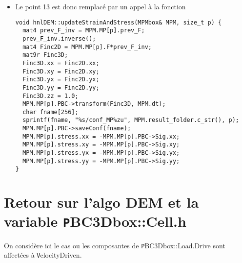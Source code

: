 \documentclass[12pt]{article}
\begin{document}
\begin{itemize}
La variable {\texttt PBC3Dbox::Load.v} est alors affectée à la valeur $\boldsymbol l$ et toutes les compoasantes de {\texttt PBC3Dbox::Load.Drive} 
sont affectées à {\texttt VelocityDriven}.
\item
Le point 13 est donc remplacé par un appel à la fonction 
\begin{verbatim} 
void hnlDEM::updateStrainAndStress(MPMbox& MPM, size_t p) {
  mat4 prev_F_inv = MPM.MP[p].prev_F;
  prev_F_inv.inverse();
  mat4 Finc2D = MPM.MP[p].F*prev_F_inv;
  mat9r Finc3D;
  Finc3D.xx = Finc2D.xx;
  Finc3D.xy = Finc2D.xy;
  Finc3D.yx = Finc2D.yx;
  Finc3D.yy = Finc2D.yy;
  Finc3D.zz = 1.0;
  MPM.MP[p].PBC->transform(Finc3D, MPM.dt);
  char fname[256];
  sprintf(fname, "%s/conf_MP%zu", MPM.result_folder.c_str(), p);
  MPM.MP[p].PBC->saveConf(fname);
  MPM.MP[p].stress.xx = -MPM.MP[p].PBC->Sig.xx;
  MPM.MP[p].stress.xy = -MPM.MP[p].PBC->Sig.xy;
  MPM.MP[p].stress.yx = -MPM.MP[p].PBC->Sig.yx;
  MPM.MP[p].stress.yy = -MPM.MP[p].PBC->Sig.yy;
}
\end{verbatim}
\end{itemize}
\section{Retour sur l'algo DEM et la variable {\texttt PBC3Dbox::Cell.h}}
On considère ici le cas ou les composantes de {\texttt PBC3Dbox::Load.Drive} sont affectées à {\texttt VelocityDriven}.


\end{document}
